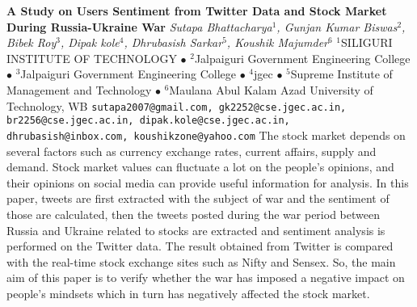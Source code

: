 
    \begin{conf-abstract}[]
        {\textbf{A Study on Users Sentiment from Twitter Data and Stock Market During Russia-Ukraine War }}
        {\textit{Sutapa Bhattacharya$^{1}$, Gunjan Kumar Biswas$^{2}$, Bibek  Roy$^{3}$, Dipak kole$^{4}$, Dhrubasish Sarkar$^{5}$, Koushik Majumder$^{6}$}}
        {$^{1}$SILIGURI INSTITUTE OF TECHNOLOGY $\bullet$ $^{2}$Jalpaiguri Government Engineering College $\bullet$ $^{3}$Jalpaiguri Government Engineering College $\bullet$ $^{4}$jgec $\bullet$ $^{5}$Supreme Institute of Management and Technology $\bullet$ $^{6}$Maulana Abul Kalam Azad University of Technology, WB}
        {\texttt{sutapa2007@gmail.com, gk2252@cse.jgec.ac.in, br2256@cse.jgec.ac.in, dipak.kole@cse.jgec.ac.in, dhrubasish@inbox.com, koushikzone@yahoo.com}}
        {The stock market depends on several factors such as currency exchange rates, current affairs, supply and demand. Stock market values can fluctuate a lot on the people's opinions, and their opinions on social media can provide useful information for analysis. In this paper, tweets are first extracted with the subject of war and the sentiment of those are calculated, then the tweets posted during the war period between Russia and Ukraine related to stocks are extracted and sentiment analysis is performed on the Twitter data. The result obtained from Twitter is compared with the real-time stock exchange sites such as Nifty and Sensex. So, the main aim of this paper is to verify whether the war has imposed a negative impact on people's mindsets which in turn has negatively affected the stock market.}
    \end{conf-abstract}
        